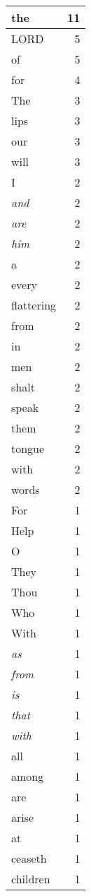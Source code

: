 \begin{center}
\begin{longtable}{l|r}
\hline \hline
\endlastfoot
the & 11 \\ \hline
LORD & 5 \\ \hline
of & 5 \\ \hline
for & 4 \\ \hline
The & 3 \\ \hline
lips & 3 \\ \hline
our & 3 \\ \hline
will & 3 \\ \hline
I & 2 \\ \hline
\emph{and} & 2 \\ \hline
\emph{are} & 2 \\ \hline
\emph{him} & 2 \\ \hline
a & 2 \\ \hline
every & 2 \\ \hline
flattering & 2 \\ \hline
from & 2 \\ \hline
in & 2 \\ \hline
men & 2 \\ \hline
shalt & 2 \\ \hline
speak & 2 \\ \hline
them & 2 \\ \hline
tongue & 2 \\ \hline
with & 2 \\ \hline
words & 2 \\ \hline
For & 1 \\ \hline
Help & 1 \\ \hline
O & 1 \\ \hline
They & 1 \\ \hline
Thou & 1 \\ \hline
Who & 1 \\ \hline
With & 1 \\ \hline
\emph{as} & 1 \\ \hline
\emph{from} & 1 \\ \hline
\emph{is} & 1 \\ \hline
\emph{that} & 1 \\ \hline
\emph{with} & 1 \\ \hline
all & 1 \\ \hline
among & 1 \\ \hline
are & 1 \\ \hline
arise & 1 \\ \hline
at & 1 \\ \hline
ceaseth & 1 \\ \hline
children & 1 \\ \hline

\end{longtable}
\end{center}
